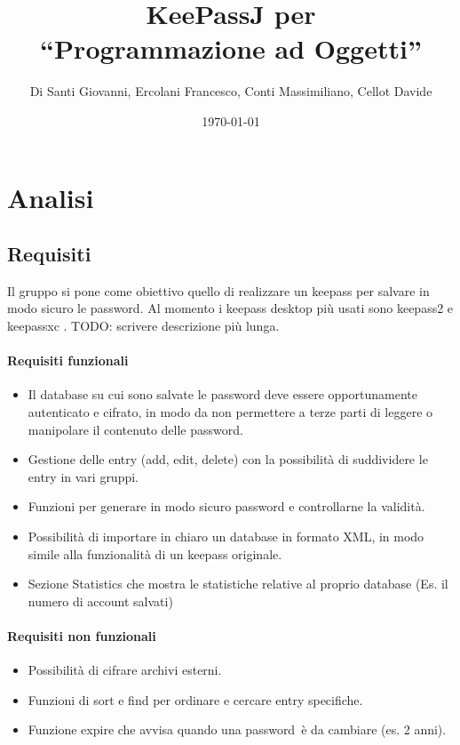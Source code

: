 \documentclass[a4paper,12pt]{report}
\title{KeePassJ per\\``Programmazione ad Oggetti''}
\author{Di Santi Giovanni, Ercolani Francesco, Conti Massimiliano, Cellot Davide}
\date{\today}
\begin{document}
 
\maketitle

\tableofcontents

\chapter{Analisi}

\section{Requisiti}

Il gruppo si pone come obiettivo quello di realizzare un keepass per salvare
in modo sicuro le password. Al momento i keepass desktop più usati sono keepass2
\cite{keepass2} e keepassxc \cite{keepassxc}.
TODO: scrivere descrizione più lunga.

\subsubsection{Requisiti funzionali}
\begin{itemize}
  \item Il database su cui sono salvate le password deve essere opportunamente
    autenticato e cifrato, in modo da non permettere a terze parti di leggere
    o manipolare il contenuto delle password.
  \item Gestione delle entry (add, edit, delete) con la possibilità di suddividere
    le entry in vari gruppi.
  \item Funzioni per generare in modo sicuro password e controllarne la validità.
  \item Possibilità di importare in chiaro un database in formato XML, in modo simile
    alla funzionalità di un keepass originale.
  \item Sezione Statistics che mostra le statistiche relative al proprio database (Es. il numero di account salvati)
\end{itemize}

\subsubsection{Requisiti non funzionali}
\begin{itemize}
  \item Possibilità di cifrare archivi esterni.
  \item Funzioni di sort e find per ordinare e cercare entry specifiche.
  \item Funzione expire che avvisa quando una password è da cambiare (es. 2 anni).
\end{itemize}
\end{document}
